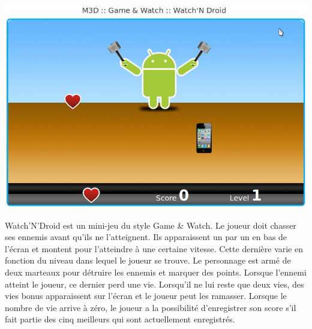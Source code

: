 \begin{minipage}{6cm}
 \includegraphics[width=\linewidth]{img/capturejeu_watchndroid}
\end{minipage}
\hfill
\begin{minipage}{9cm}
Watch’N’Droid est un mini-jeu du style Game \& Watch. 
Le joueur doit chasser ses ennemis avant qu'ils ne l’atteignent. 
Ils apparaissent un par un en bas de l’écran et montent pour l'atteindre à une certaine vitesse.
Cette dernière varie en fonction du niveau dans lequel le joueur se trouve. 
Le personnage est armé de deux marteaux pour détruire les ennemis et marquer des points. 
Lorsque l’ennemi atteint le joueur, ce dernier perd une vie.
Lorsqu’il ne lui reste que deux vies, des vies bonus apparaissent sur l’écran et le joueur peut les ramasser. 
Lorsque le nombre de vie arrive à zéro, le joueur a la possibilité d’enregistrer son score s'il fait partie
 des cinq meilleurs qui sont actuellement enregistrés.
\end{minipage}

